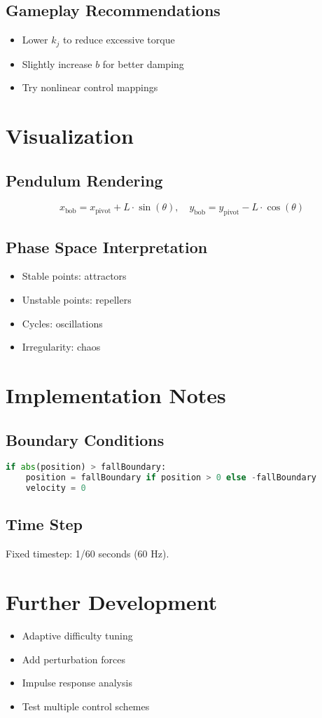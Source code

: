 \documentclass[11pt]{article}
\begin{document}
\subsection{Gameplay Recommendations}
\begin{itemize}
  \item Lower $k_j$ to reduce excessive torque
  \item Slightly increase $b$ for better damping
  \item Try nonlinear control mappings
\end{itemize}

\section{Visualization}

\subsection{Pendulum Rendering}

\[
x_{\text{bob}} = x_{\text{pivot}} + L \cdot \sin(\theta), \quad
y_{\text{bob}} = y_{\text{pivot}} - L \cdot \cos(\theta)
\]

\subsection{Phase Space Interpretation}
\begin{itemize}
  \item Stable points: attractors
  \item Unstable points: repellers
  \item Cycles: oscillations
  \item Irregularity: chaos
\end{itemize}

\section{Implementation Notes}

\subsection{Boundary Conditions}
\begin{lstlisting}[language=Python]
if abs(position) > fallBoundary:
    position = fallBoundary if position > 0 else -fallBoundary
    velocity = 0
\end{lstlisting}

\subsection{Time Step}

Fixed timestep: 1/60 seconds (60 Hz).

\section{Further Development}
\begin{itemize}
  \item Adaptive difficulty tuning
  \item Add perturbation forces
  \item Impulse response analysis
  \item Test multiple control schemes
\end{itemize}
\end{document}
